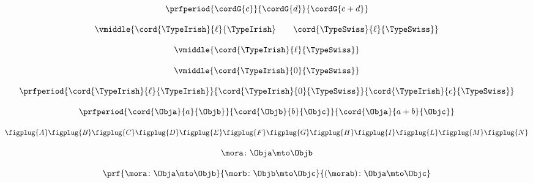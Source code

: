 \begin{forslides}
        \begin{equation}
            \label{eq:54}
    \prfperiod{
        \cordG{c}
    }{
        \cordG{d}
    }{
        \cordG{c+d}
    }
        \end{equation}
        
         \begin{equation}
            \label{eq:55}
            \vmiddle{\cord{\TypeIrish}{\ell}{\TypeIrish} \qquad \cord{\TypeSwiss}{\ell}{\TypeSwiss}}
        \end{equation}
        
         \begin{equation}
            \label{eq:56}
            \vmiddle{\cord{\TypeIrish}{\ell}{\TypeSwiss}}
        \end{equation}
        
         \begin{equation}
            \label{eq:57}
            \vmiddle{\cord{\TypeIrish}{0}{\TypeSwiss}}
        \end{equation}
        
         \begin{equation}
            \label{eq:58}
            \prfperiod{
        \cord{\TypeIrish}{\ell}{\TypeIrish}
    }{
        \cord{\TypeIrish}{0}{\TypeSwiss}
    }{
        \cord{\TypeIrish}{c}{\TypeSwiss}
    }
        \end{equation}
        
         \begin{equation}
            \label{eq:59}
            \prfperiod{
        \cord{\Obja}{a}{\Objb}
    }{
        \cord{\Objb}{b}{\Objc}
    }{
        \cord{\Obja}{a+b}{\Objc}
    }
        \end{equation}
        
         \begin{equation}
            \label{eq:60}
            \centering
    \figplug{A}
    \figplug{B}
    \figplug{C}
    \figplug{D}
    \figplug{E}
    \figplug{F}
    \figplug{G}
    \figplug{H}
    \figplug{I}
    \figplug{L}
    \figplug{M}
    \figplug{N}
        \end{equation}
        
         \begin{equation}
            \label{eq:61}
            \mora\colon \Obja \mto \Objb
        \end{equation}
        
         \begin{equation}
            \label{eq:62}
            \prf{
        \mora \colon \Obja \mto \Objb
    }{
        \morb\colon \Objb \mto \Objc
    }{
        (\morab )\colon \Obja \mto \Objc
    }
        \end{equation}
        

\end{forslides}
